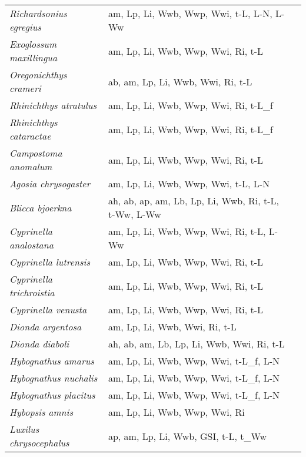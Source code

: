 {\begin{longtable}[c]{p{3.5cm}p{5.5cm}p{5.5cm}}
\emph{Richardsonius egregius} &  am, Lp, Li, Wwb, Wwp, Wwi, t-L, L-N, L-Ww & \citet{Even1969,Bird1975} \\
\emph{Exoglossum maxillingua} &  am, Lp, Li, Wwb, Wwp, Wwi, Ri, t-L & \citet{PappDale1964,CowlAlle2013,MaurGree2001} \\
\emph{Oregonichthys crameri} &  ab, am, Lp, Li, Wwb, Wwi, Ri, t-L & \citet{ScheMcDo2003,Anon1998} \\
\emph{Rhinichthys atratulus} &  am, Lp, Li, Wwb, Wwp, Wwi, Ri, t-L\_f & \citet{ReedMoul1973,FrakSnod2002} \\
\emph{Rhinichthys cataractae} &  am, Lp, Li, Wwb, Wwp, Wwi, Ri, t-L\_f & \citet{ReedMoul1973,FrakSnod2002} \\
\emph{Campostoma anomalum} &  am, Lp, Li, Wwb, Wwp, Wwi, Ri, t-L &  \\
\emph{Agosia chrysogaster} &  am, Lp, Li, Wwb, Wwp, Wwi, t-L, L-N & \citet{Wint1962,Kepn1982} \\
\emph{Blicca bjoerkna} &  ah, ab, ap, am, Lb, Lp, Li, Wwb, Ri, t-L, t-Ww, L-Ww & \citet{SchoBreu2006,YilmYazi2015} \\
\emph{Cyprinella analostana} &  am, Lp, Li, Wwb, Wwp, Wwi, Ri, t-L, L-Ww & \citet{DenoMess1982} \\
\emph{Cyprinella lutrensis} &  am, Lp, Li, Wwb, Wwp, Wwi, Ri, t-L & \citet{Cobu1986} \\
\emph{Cyprinella trichroistia} &  am, Lp, Li, Wwb, Wwp, Wwi, Ri, t-L & \citet{ScotMayd2008} \\
\emph{Cyprinella venusta} &  am, Lp, Li, Wwb, Wwp, Wwi, Ri, t-L &  \\
\emph{Dionda argentosa} &  am, Lp, Li, Wwb, Wwi, Ri, t-L & \citet{RobeBonn2016,GibsFrie2005} \\
\emph{Dionda diaboli} &  ah, ab, am, Lb, Lp, Li, Wwb, Wwi, Ri, t-L & \citet{HulbBonn2007,GibsFrie2005} \\
\emph{Hybognathus amarus} &  am, Lp, Li, Wwb, Wwp, Wwi, t-L\_f, L-N & \citet{CowlShir2006,CaldFalc2019} \\
\emph{Hybognathus nuchalis} &  am, Lp, Li, Wwb, Wwp, Wwi, t-L\_f, L-N & \citet{RamiPill2018} \\
\emph{Hybognathus placitus} &  am, Lp, Li, Wwb, Wwp, Wwi, t-L\_f, L-N & \citet{TaylMill1990} \\
\emph{Hybopsis amnis} &  am, Lp, Li, Wwb, Wwp, Wwi, Ri & \citet{Cobu1986} \\
\emph{Luxilus chrysocephalus} &  ap, am, Lp, Li, Wwb, GSI, t-L, t\_Ww & \citet{SimmBeck2012,Cobu1986} \\

\end{longtable}}
